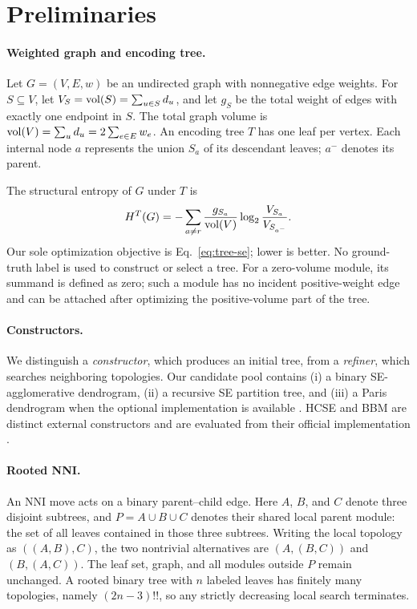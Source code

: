 \section{Preliminaries}
\paragraph{Weighted graph and encoding tree.}
Let $G=(V,E,w)$ be an undirected graph with nonnegative edge weights. For
$S\subseteq V$, let $V_S=\operatorname{vol}(S)=\sum_{u\in S}d_u$, and let $g_S$ be the total
weight of edges with exactly one endpoint in $S$. The total graph volume is
$\operatorname{vol}(V)=\sum_ud_u=2\sum_{e\in E}w_e$. An encoding tree $T$ has one leaf per
vertex. Each internal node $a$ represents the union $S_a$ of its descendant
leaves; $a^-$ denotes its parent.

The structural entropy of $G$ under $T$ is
\begin{equation}
 H^{T}(G)=-\sum_{a\ne r}\frac{g_{S_a}}{\operatorname{vol}(V)}
 \log_2\frac{V_{S_a}}{V_{S_{a^-}}}.
 \label{eq:tree-se}
\end{equation}
Our sole optimization objective is Eq.~\eqref{eq:tree-se}; lower is better.
No ground-truth label is used to construct or select a tree.
For a zero-volume module, its summand is defined as zero; such a module has no
incident positive-weight edge and can be attached after optimizing the
positive-volume part of the tree.

\paragraph{Constructors.}
We distinguish a \emph{constructor}, which produces an initial tree, from a
\emph{refiner}, which searches neighboring topologies. Our candidate pool
contains (i) a binary SE-agglomerative dendrogram, (ii) a recursive SE
partition tree, and (iii) a Paris dendrogram when the optional implementation
is available \cite{bonald2018paris}. HCSE and BBM are distinct external
constructors and are evaluated from their official implementation
\cite{pan2025}.

\paragraph{Rooted NNI.}
An NNI move acts on a binary parent--child edge. Here $A$, $B$, and $C$ denote
three disjoint subtrees, and $P=A\cup B\cup C$ denotes their shared local
parent module: the set of all leaves contained in those three subtrees.
Writing the local topology as $((A,B),C)$, the two nontrivial alternatives are
$(A,(B,C))$ and $(B,(A,C))$. The leaf set, graph, and all modules outside $P$
remain unchanged. A rooted binary tree with $n$ labeled
leaves has finitely many topologies, namely $(2n-3)!!$, so any strictly
decreasing local search terminates.
